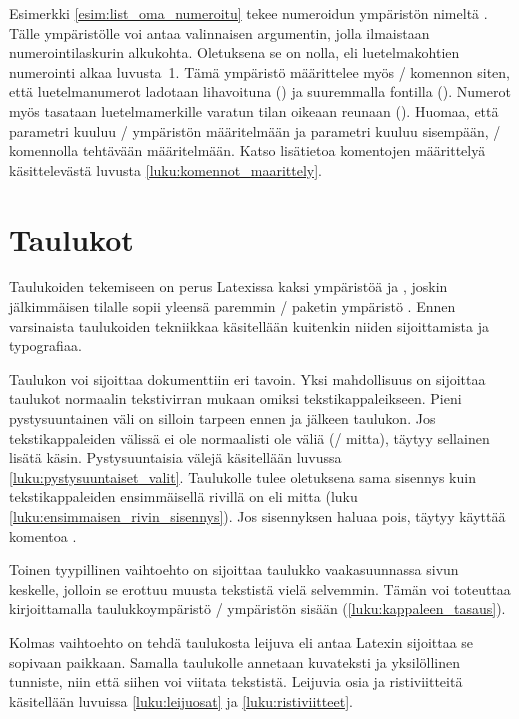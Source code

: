 Esimerkki \ref{esim:list_oma_numeroitu} tekee numeroidun ympäristön
nimeltä . Tälle ympäristölle voi antaa valinnaisen
argumentin, jolla ilmaistaan numerointilaskurin alkukohta. Oletuksena se
on nolla, eli luetelmakohtien numerointi alkaa luvusta~1. Tämä ympäristö
määrittelee myös \-/ komennon siten, että
luetelmanumerot ladotaan lihavoituna () ja suuremmalla
fontilla (). Numerot myös tasataan luetelmamerkille
varatun tilan oikeaan reunaan (). Huomaa, että parametri
 kuuluu \-/ ympäristön määritelmään ja
parametri  kuuluu sisempään, \-/
komennolla tehtävään määritelmään. Katso lisätietoa komentojen
määrittelyä käsittelevästä luvusta \ref{luku:komennot_maarittely}.

\section{Taulukot}
\label{luku:taulukot}

Taulukoiden tekemiseen on perus Latexissa kaksi ympäristöä
 ja , joskin jälkimmäisen tilalle
sopii yleensä paremmin \-/ paketin ympäristö
. Ennen varsinaista taulukoiden tekniikkaa
käsitellään kuitenkin niiden sijoittamista ja typografiaa.

Taulukon voi sijoittaa dokumenttiin eri tavoin. Yksi mahdollisuus on
sijoittaa taulukot normaalin tekstivirran mukaan omiksi
tekstikappaleikseen. Pieni pystysuuntainen väli on silloin tarpeen ennen
ja jälkeen taulukon. Jos tekstikappaleiden välissä ei ole normaalisti
ole väliä (\-/ mitta), täytyy sellainen lisätä käsin.
Pystysuuntaisia välejä käsitellään luvussa
\ref{luku:pystysuuntaiset_valit}. Taulukolle tulee oletuksena sama
sisennys kuin tekstikappaleiden ensimmäisellä rivillä on eli mitta
 (luku \ref{luku:ensimmaisen_rivin_sisennys}). Jos
sisennyksen haluaa pois, täytyy käyttää komentoa .

Toinen tyypillinen vaihtoehto on sijoittaa taulukko vaakasuunnassa sivun
keskelle, jolloin se erottuu muusta tekstistä vielä selvemmin. Tämän voi
toteuttaa kirjoittamalla taulukkoympäristö \-/
ympäristön sisään (\ref{luku:kappaleen_tasaus}).

Kolmas vaihtoehto on tehdä taulukosta leijuva eli antaa Latexin
sijoittaa se sopivaan paikkaan. Samalla taulukolle annetaan kuvateksti
ja yksilöllinen tunniste, niin että siihen voi viitata tekstistä.
Leijuvia osia ja ristiviitteitä käsitellään luvuissa
\ref{luku:leijuosat} ja \ref{luku:ristiviitteet}.

